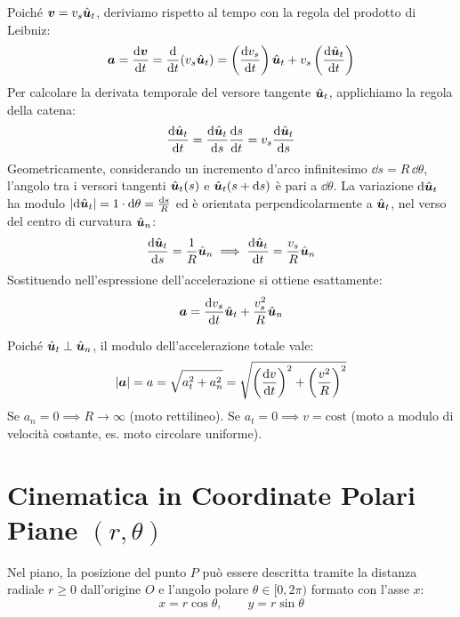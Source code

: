 \begin{dimostrazione}
Poiché $\bm{v} = v_s \hat{\bm{u}}_t$, deriviamo rispetto al tempo con la regola del prodotto di Leibniz:
\begin{equation}
    \bm{a} = \frac{\mathrm{d} \bm{v}}{\mathrm{d} t} = \frac{\mathrm{d} }{\mathrm{d} t}(v_s \hat{\bm{u}}_t) = \left(\frac{\mathrm{d} v_s}{\mathrm{d} t}\right)\hat{\bm{u}}_t + v_s \left(\frac{\mathrm{d} \hat{\bm{u}}_t}{\mathrm{d} t}\right)
\end{equation}
Per calcolare la derivata temporale del versore tangente $\hat{\bm{u}}_t$, applichiamo la regola della catena:
\begin{equation}
    \frac{\mathrm{d} \hat{\bm{u}}_t}{\mathrm{d} t} = \frac{\mathrm{d} \hat{\bm{u}}_t}{\mathrm{d} s} \frac{\mathrm{d} s}{\mathrm{d} t} = v_s \frac{\mathrm{d} \hat{\bm{u}}_t}{\mathrm{d} s}
\end{equation}
Geometricamente, considerando un incremento d'arco infinitesimo $\dd s = R\,\dd\theta$, l'angolo tra i versori tangenti $\hat{\bm{u}}_t(s)$ e $\hat{\bm{u}}_t(s+\mathrm{d} s)$ è pari a $\dd\theta$. La variazione $\mathrm{d}\hat{\bm{u}}_t$ ha modulo $|\mathrm{d}\hat{\bm{u}}_t| = 1 \cdot \mathrm{d}\theta = \frac{\mathrm{d} s}{R}$ ed è orientata perpendicolarmente a $\hat{\bm{u}}_t$, nel verso del centro di curvatura $\hat{\bm{u}}_n$:
\begin{equation}
    \frac{\mathrm{d} \hat{\bm{u}}_t}{\mathrm{d} s} = \frac{1}{R}\hat{\bm{u}}_n \implies \frac{\mathrm{d} \hat{\bm{u}}_t}{\mathrm{d} t} = \frac{v_s}{R}\hat{\bm{u}}_n
\end{equation}
Sostituendo nell'espressione dell'accelerazione si ottiene esattamente:
\begin{equation}
    \bm{a} = \frac{\mathrm{d} v_s}{\mathrm{d} t}\hat{\bm{u}}_t + \frac{v_s^2}{R}\hat{\bm{u}}_n
\end{equation}
\end{dimostrazione}

\begin{osservazione}
Poiché $\hat{\bm{u}}_t \perp \hat{\bm{u}}_n$, il modulo dell'accelerazione totale vale:
\begin{equation}
    |\bm{a}| = a = \sqrt{a_t^2 + a_n^2} = \sqrt{\left(\frac{\mathrm{d} v}{\mathrm{d} t}\right)^2 + \left(\frac{v^2}{R}\right)^2}
\end{equation}
Se $a_n = 0 \implies R \to \infty$ (moto rettilineo). Se $a_t = 0 \implies v = \text{cost}$ (moto a modulo di velocità costante, es. moto circolare uniforme).
\end{osservazione}

\section{Cinematica in Coordinate Polari Piane $(r, \theta)$}
\label{sec:coordinate_polari}

Nel piano, la posizione del punto $P$ può essere descritta tramite la distanza radiale $r \ge 0$ dall'origine $O$ e l'angolo polare $\theta \in [0, 2\pi)$ formato con l'asse $x$:
\begin{equation}
    x = r\cos\theta, \qquad y = r\sin\theta
\end{equation}

